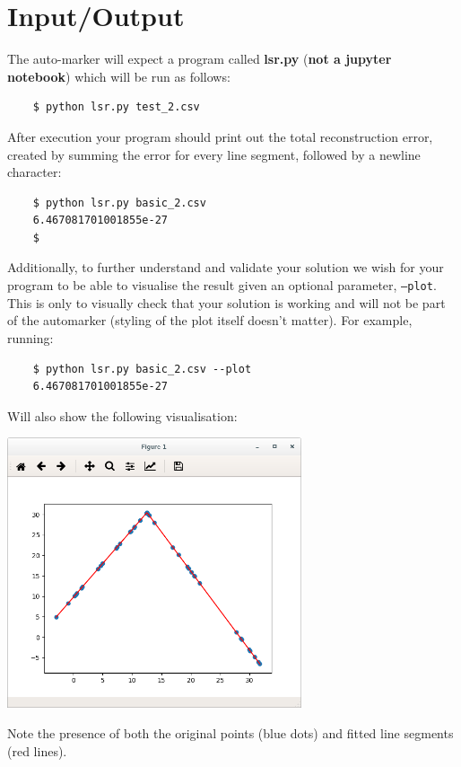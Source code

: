 \documentclass[12pt]{article}
\begin{document}
\section{Input/Output}
\label{sec:IO}

The auto-marker will expect a program called \textbf{lsr.py} (\textbf{not a jupyter notebook}) which will be run as follows:
\begin{verbatim}
    $ python lsr.py test_2.csv
\end{verbatim}

After execution your program should print out the total reconstruction error, created by summing the error for every line segment, followed by a newline character:

\begin{verbatim}
    $ python lsr.py basic_2.csv
    6.467081701001855e-27
    $
\end{verbatim}

Additionally, to further understand and validate your solution we wish for your program to be able to visualise the result given an optional parameter, \texttt{--plot}.
This is only to visually check that your solution is working and will not be part of the automarker (styling of the plot itself doesn't matter).
For example, running:

\begin{verbatim}
    $ python lsr.py basic_2.csv --plot
    6.467081701001855e-27
\end{verbatim}

Will also show the following visualisation:

\includegraphics[width=0.65\textwidth]{CW1_visualisation}

Note the presence of both the original points (blue dots) and fitted line segments (red lines).
\end{document}
